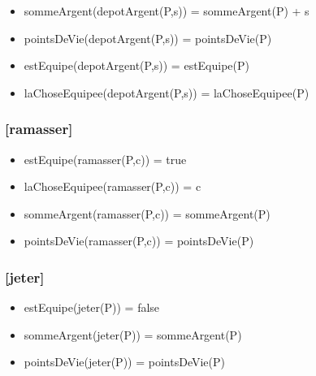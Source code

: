 \documentclass[11pt]{article}
\begin{document}
\begin{itemize}

\item sommeArgent(depotArgent(P,s)) = sommeArgent(P) + s\\
\label{sec-1.7.6.1}


\item pointsDeVie(depotArgent(P,s)) = pointsDeVie(P)\\
\label{sec-1.7.6.2}


\item estEquipe(depotArgent(P,s)) = estEquipe(P)\\
\label{sec-1.7.6.3}


\item laChoseEquipee(depotArgent(P,s)) = laChoseEquipee(P)\\
\label{sec-1.7.6.4}


\end{itemize} %
\subsubsection{[ramasser]}
\label{sec-1.7.7}

\begin{itemize}

\item estEquipe(ramasser(P,c)) = true\\
\label{sec-1.7.7.1}


\item laChoseEquipee(ramasser(P,c)) = c\\
\label{sec-1.7.7.2}


\item sommeArgent(ramasser(P,c)) = sommeArgent(P)\\
\label{sec-1.7.7.3}


\item pointsDeVie(ramasser(P,c)) = pointsDeVie(P)\\
\label{sec-1.7.7.4}


\end{itemize} %
\subsubsection{[jeter]}
\label{sec-1.7.8}

\begin{itemize}

\item estEquipe(jeter(P)) = false\\
\label{sec-1.7.8.1}


\item sommeArgent(jeter(P)) = sommeArgent(P)\\
\label{sec-1.7.8.2}


\item pointsDeVie(jeter(P)) = pointsDeVie(P)\\
\label{sec-1.7.8.3}

\end{itemize} %
\end{document}
